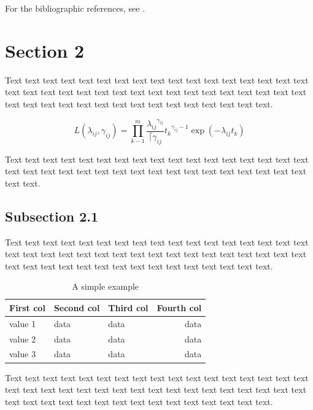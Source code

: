 \documentclass{ejasa}
\begin{document}
For the bibliographic references, see \citet{celmicnvs1987least,nguyen2006fundamentals,yabuuchi1997fuzzy}.

\section{Section 2}
Text text text text text text text text text text text text text text text text text text text text text text text text text text text text text text text text text text text text text text text text text text text text text text text text text.

\begin{equation}\label{eq1}
L(\lambda_{ij},\gamma_{ij}) =  \prod_{k-1}^{m} \frac{\lambda_{ij}{^{\gamma_{ij}}}}{ \lceil \gamma_{ij}} t{_k}{^{\gamma_{ij} -1}} \exp(-\lambda_{ij}t_{k})
\end{equation}

Text text text text text text text text text text text text text text text text text text text text text text text text text text text text text text text text text text text text.

\subsection{Subsection 2.1}

Text text text text text text text text text text text text text text text text text text text text text text text text text text text text text text text text text text text text text text text text text text text text text text text text text.

\begin{table}[htb]
\caption{A simple example}
\begin{center}
\begin{tabular}{lllr} \toprule
       First col & Second col & Third col & Fourth col \\ \midrule
       value 1 & data & data & data \\
       value 2 & data & data & data  \\
      value 3 & data & data & data \\ \bottomrule
\end{tabular}
\end{center}
\label{tab:ex}
\end{table}

Text text text text text text text text text text text text text text text text text text text text text text text text text text text text text text text text text text text text text text text text text text text text text text text text text.
\end{document}
